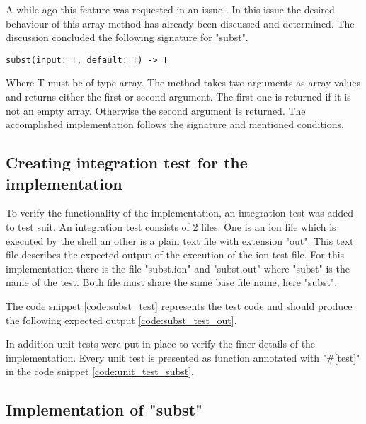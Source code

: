 A while ago this feature was requested in an issue \cite{issue_subst_request}.
In this issue the desired behaviour of this array method has already been discussed and determined.
The discussion concluded the following signature for "subst".
\begin{verbatim}
subst(input: T, default: T) -> T
\end{verbatim}
Where T must be of type array.
The method takes two arguments as array values and returns either the first or second argument.
The first one is returned if it is not an empty array. Otherwise the second argument is returned.
The accomplished implementation follows the signature and mentioned conditions.

\subsection{Creating integration test for the implementation}\label{subst_test}

To verify the functionality of the implementation, an integration test was added to test suit.
An integration test consists of 2 files. One is an ion file which is executed by the shell an other is a plain text file with extension "out".
This text file describes the expected output of the execution of the ion test file.
For this implementation there is the file "subst.ion" and "subst.out"
where "subst" is the name of the test. Both file must share the same base file name, here "subst".

The code snippet \ref{code:subst_test} represents the test code and should
produce the following expected output \ref{code:subst_test_out}.



\clearpage



In addition unit tests were put in place to verify the finer details of the implementation.
Every unit test is presented as function annotated with "\#[test]" in the code snippet \ref{code:unit_test_subst}.


\subsection{Implementation of "subst"}


